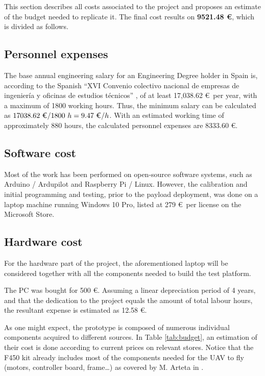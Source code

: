 This section describes all costs associated to the project and proposes an estimate
of the budget needed to replicate it. The final cost results on \textbf{9521.48 \euro}, which is divided as follows.

\subsection{Personnel expenses}
The base annual engineering salary for an Engineering Degree holder in Spain is, according to the Spanish ``XVI Convenio colectivo nacional de empresas de ingenier\'ia y oficinas de estudios t\'ecnicos'' \cite{disposicin16097deboenm274de20112011}, of at least 17,038.62 \euro\ per year, with a maximum of 1800 working hours.
Thus, the minimum salary can be calculated as $17038.62\ \text{\euro} / 1800\ h = 9.47\ \text{\euro}/h $. With an estimated working time of approximately 880 hours, the calculated personnel expenses are 8333.60 \euro.

\subsection{Software cost}
Most of the work has been performed on open-source software systems, such as Arduino / Ardupilot and Raspberry Pi / Linux.
However, the calibration and initial programming and testing, prior to the payload deployment, was done on a laptop machine running Windows 10 Pro, listed at 279 \euro\ per license on the Microsoft Store.

\subsection{Hardware cost}
For the hardware part of the project, the aforementioned laptop will be considered together with all the components needed to build the test platform.

The PC was bought for 500 \euro. Assuming a linear depreciation period of 4 years, and that the dedication to the project equals the amount of total labour hours, the resultant expense is estimated as 12.58 \euro.

As one might expect, the prototype is composed of numerous individual components acquired to different sources.
In Table \ref{tab:budget}, an estimation of their cost is done according to current prices on relevant stores.
Notice that the F450 kit already includes most of the components needed for the UAV to fly (motors, controller board, frame\ldots) as covered by M. Arteta in \cite{arteta2015}.



